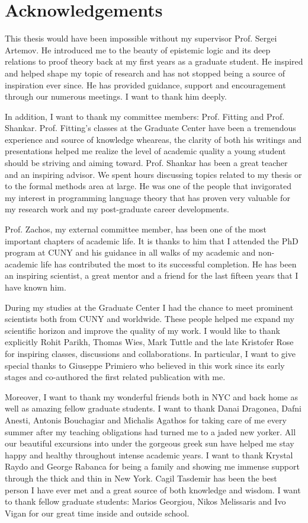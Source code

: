 \section*{Acknowledgements}
This thesis would have been impossible without my supervisor Prof. Sergei Artemov.
He introduced me to the beauty of epistemic logic and its deep relations to proof theory
back at my first years as a graduate student. He inspired and helped shape my topic of research and 
has not stopped being a source of inspiration ever
since. He has provided guidance, support and encouragement through our numerous meetings. 
I want to thank him deeply.

In addition, I want to thank my committee members: Prof. Fitting and Prof. Shankar. Prof. Fitting's classes
 at the Graduate Center have been a tremendous experience and source of knowledge wheareas,
the clarity of  both his writings and presentations helped me realize the 
level of academic quality a young student should be striving and aiming toward. Prof. Shankar has
been a great teacher and an inspiring advisor. We spent hours 
discussing topics related to my thesis or to the formal methods area at large. He was one
of the people that invigorated my interest in programming language theory that has
proven very valuable for my research work and my post-graduate career developments.

Prof. Zachos, my external committee member, has been one of the most important
chapters of academic life. It is thanks to him that I attended the PhD program at CUNY
and his guidance in all walks of my academic and non-academic life has contributed 
the most  to its successful completion. He has been an inspiring
scientist, a great mentor and a friend for the last fifteen years that I have 
known him. 

During my studies at the Graduate Center I had the chance to meet 
prominent scientists both from CUNY and worldwide. 
These people helped me expand my scientific horizon and improve
the quality of my work. I would like to thank explicitly Rohit Parikh, Thomas Wies,  
 Mark Tuttle and the late Kristofer Rose for inspiring classes, discussions and collaborations.
In particular, I want to give special thanks to Giuseppe Primiero who believed in this work
since its early stages and co-authored the first related publication with me.

Moreover, I want to thank my wonderful friends both in NYC and back home as well as 
amazing fellow graduate students. I want to thank Danai Dragonea, Dafni Anesti, Antonis Bouchagiar 
and Michalis Agathos for taking care of me every summer after my teaching obligations
had turned me to a jaded new yorker. All our beautiful excursions into under the gorgeous
greek sun have helped me stay happy and healthy throughout intense academic years.
I want to thank Krystal Raydo and George Rabanca for being a family and showing me immense support
through the thick and thin in New York. 
Cagil Tasdemir has been the best person I have ever met and a great source of both knowledge and wisdom.
I want to thank fellow graduate students: Marios Georgiou,
Nikos Melissaris and Ivo Vigan for our great time inside and outside school.

